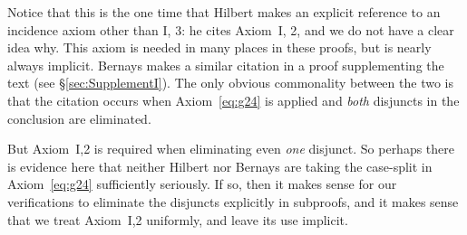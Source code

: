 Notice that this is the one time that Hilbert makes an explicit reference to an incidence axiom other than I, 3: he cites Axiom~I, 2, and we do not have a clear idea why. This axiom is needed in many places in these proofs, but is nearly always implicit. Bernays makes a similar citation in a proof supplementing the text (see \S\ref{sec:SupplementI}). The only obvious commonality between the two is that the citation occurs when Axiom~\ref{eq:g24} is applied and \emph{both} disjuncts in the conclusion are eliminated. 

But Axiom~I,2 is required when eliminating even \emph{one} disjunct. So perhaps there is evidence here that neither Hilbert nor Bernays are taking the case-split in Axiom~\ref{eq:g24} sufficiently seriously. If so, then it makes sense for our verifications to eliminate the disjuncts explicitly in subproofs, and it makes sense that we treat Axiom~I,2 uniformly, and leave its use implicit.

